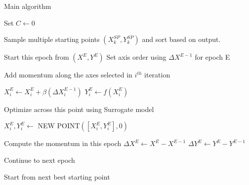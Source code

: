 \begin{algorithm}
\caption{Main algorithm}\label{alg:rbf}
\begin{algorithmic}[1]
\State Set $C \gets 0$   

\State Sample multiple starting points $(X^{SP}_k, Y^{SP}_k)$ and sort based on output.


  \State Start this epoch from $(X^{E},Y^{E})$
  \State Set axis order using $\Delta X^{E-1}$ for epoch E
      
    
    \State Add momentum along the axes selected in $i^{th}$ iteration
    
    \State $X_i^{E} \gets X_i^{E} + \beta(\Delta X_i^{E-1})$
    \State $Y_i^{E} \gets f(X_i^{E})$
    
    \State Optimize across this point using Surrogate model
    
    \State $X_i^{E}, Y_i^{E} \gets$ NEW POINT$([X_i^{E}, Y_i^{E}],0)$
   
    \EndFor
    
    \State Compute the momentum in this epoch
    \State $\Delta X^{E} \gets X^{E} - X^{E-1}$
    \State $\Delta Y^{E} \gets Y^{E} - Y^{E-1}$

      
    
        \State Continue to next epoch
        
    \Else           {}
        \State Start from next best starting point
    \EndIf
    
  \EndWhile\label{MaxEpochs} 

\EndWhile\label{FunctionCalls}


\EndProcedure
\end{algorithmic}
\end{algorithm}

